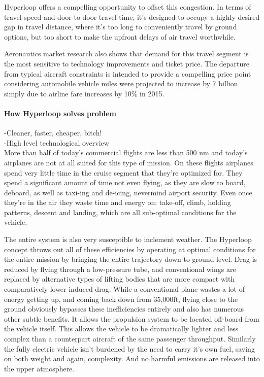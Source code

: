 	Hyperloop offers a compelling opportunity to offset this congestion.
	In terms of travel speed and door-to-door travel time,
	it's designed to occupy a highly desired gap in travel distance, where it's
	too long to conveniently travel by ground options,
	but too short to make the upfront delays of air travel worthwhile.

	Aeronautics market research \cite{H. Baik} also shows that demand for this
	travel segment is the most sensitive to technology improvements and ticket
	price. The departure from typical aircraft constraints
	is intended to provide a compelling price point
	considering automobile vehicle miles were
	projected to increase by 7 billion simply due to airline
	fare increases by 10\% in 2015.

\paragraph{How Hyperloop solves problem}
	-Cleaner, faster, cheaper, bitch!\\
	-High level technological overview\\

	More than half of today’s commercial flights are less than 500 nm
	and today’s airplanes are not at all suited for this type of mission.
	On these flights airplanes spend very little time in the cruise segment that they’re optimized for.
	They spend a significant amount of time not even flying,
	as they are slow to board, deboard, as well as taxi-ing and de-icing, nevermind airport security.
	Even once they’re in the air they waste time and energy on: take-off, climb,
	holding patterns, descent and landing, which are all sub-optimal conditions for the vehicle.

	The entire system is also very susceptible to inclement weather.
	The Hyperloop concept throws out all of these efficiencies by operating at
	optimal conditions for the entire mission by bringing the entire trajectory down to ground level.
	Drag is reduced by flying through a low-pressure tube,
	and conventional wings are replaced by alternative types of lifting bodies
	that are more compact with comparatively lower induced drag.
	While a conventional plane wastes a lot of energy getting up,
	and coming back down from 35,000ft,
	flying close to the ground obviously bypasses these inefficiencies entirely
	and also has numerous other subtle benefits.
	It allows the propulsion system to be located off-board from the vehicle itself.
	This allows the vehicle to be dramatically lighter and less complex than a
	counterpart aircraft of the same passenger throughput.
	Similarly the fully electric vehicle isn’t burdened by the need to carry it’s own fuel,
	saving on both weight and again, complexity.
	And no harmful emissions are released into the upper atmosphere.

